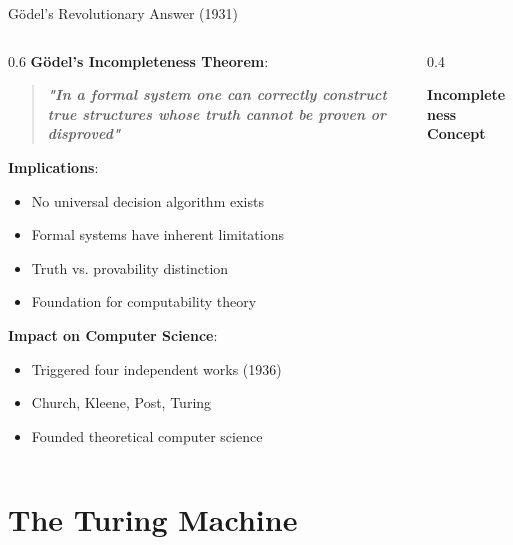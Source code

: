\documentclass[aspectratio=169]{beamer}
\newcommand{\concept}[1]{\textbf{\color{darkblue}#1}}
\begin{document}
\begin{frame}{Gödel's Revolutionary Answer (1931)}
\begin{columns}
\begin{column}{0.6\textwidth}
\concept{Gödel's Incompleteness Theorem}:
\begin{quote}
\textbf{\textit{"In a formal system one can correctly construct true structures whose truth cannot be proven or disproved"}}
\end{quote}

\vspace{0.3cm}
\concept{Implications}:
\begin{itemize}
\item No universal decision algorithm exists
\item Formal systems have inherent limitations
\item Truth vs. provability distinction
\item Foundation for computability theory
\end{itemize}

\vspace{0.3cm}
\concept{Impact on Computer Science}:
\begin{itemize}
\item Triggered four independent works (1936)
\item Church, Kleene, Post, Turing
\item Founded theoretical computer science
\end{itemize}
\end{column}
\begin{column}{0.4\textwidth}
\begin{center}
\textbf{Incompleteness Concept}
\vspace{0.3cm}

\end{center}
\end{column}
\end{columns}
\end{frame}

\section{The Turing Machine}
\end{document}
